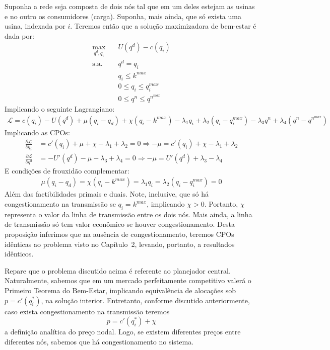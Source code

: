Suponha a rede seja composta de dois nós tal que em um deles estejam as usinas e no outro os consumidores (carga). Suponha, mais ainda, que só exista uma usina, indexada por $i$. Teremos então que a solução maximizadora de bem-estar é dada por:
\begin{align*}
    \max_{q^d,q_i}&\quad U(q^d)-c(q_i)\\
    \text{s.a.}&\quad q^d=q_i\\
    &\quad q_i\le k^{max}\\
    &\quad 0\le q_i\le q_i^{max}\\
    &\quad 0\le q^n \le q^{n^{max}}
\end{align*}
Implicando o seguinte Lagrangiano:
\begin{align*}
    \mathcal{L} = c(q_i)-U(q^d)+\mu(q_i-q_d)+\chi(q_i-k^{max}) - \lambda_1q_i + \lambda_2(q_i-q_i^{max}) - \lambda_3q^n + \lambda_4(q^n-q^{n^{max}})
\end{align*}
Implicando as CPOs:
\begin{align*}
    \frac{\partial\mathcal{L}}{\partial q_i} &= c'(q_i) +\mu +\chi -\lambda_1+\lambda_2 = 0 \Rightarrow -\mu = c'(q_i)+\chi-\lambda_1 + \lambda_2 \\ 
    \frac{\partial\mathcal{L}}{\partial q^d} &= - U'(q^d) - \mu -\lambda_3+\lambda_4=0 \Rightarrow -\mu = U'(q^d) + \lambda_3-\lambda_4
\end{align*}
E condições de frouxidão complementar:
\begin{align*}
    \mu(q_i-q_d)=\chi(q_i-k^{max}) =\lambda_1q_i =\lambda_2(q_i-q_i^{max})=0
\end{align*}
Além das factibilidades primais e duais. Note, inclusive, que só há congestionamento na transmissão se $q_i=k^{max}$, implicando $\chi>0$. Portanto, $\chi$ representa o valor da linha de transmissão entre os dois nós. Mais ainda, a linha de transmissão só tem valor econômico se houver congestionamento. Desta proposição inferimos que na ausência de congestionamento, teremos CPOs idênticas ao problema visto no Capítulo~2, levando, portanto, a resultados idênticos.

Repare que o problema discutido acima é referente ao planejador central. Naturalmente, sabemos que em um mercado perfeitamente competitivo valerá o Primeiro Teorema do Bem-Estar, implicando equivalência de alocações sob $p=c'(q_i^*)$, na solução interior. Entretanto, conforme discutido anteriormente, caso exista congestionamento na transmissão teremos 
\[p=c'(q_i^*)+\chi\] 
a definição analítica do preço nodal. Logo, se existem diferentes preços entre diferentes nós, sabemos que há congestionamento no sistema.

